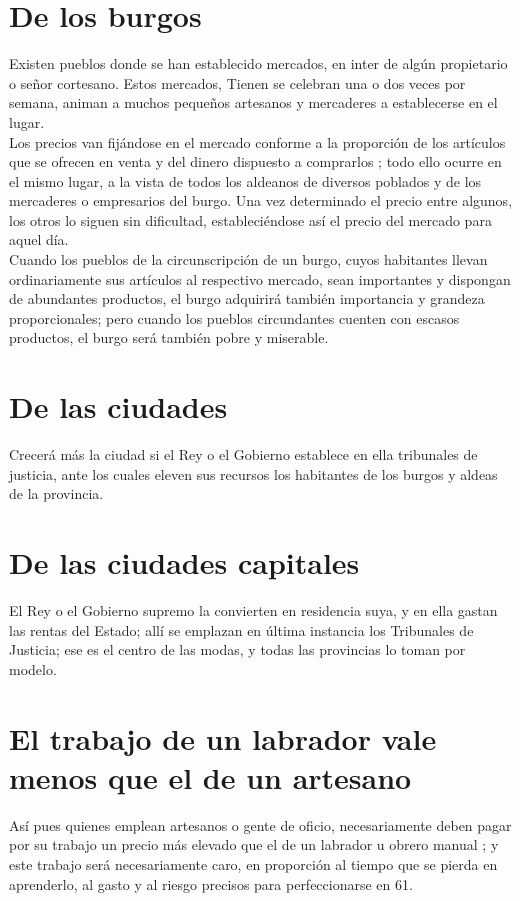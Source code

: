 \documentclass[10pt]{article}
\begin{document}
\begin{multicols}{1}
\section*{De los burgos}
Existen pueblos donde se han establecido mercados, en inter de algún propietario o señor cortesano. Estos mercados, Tienen se celebran una o dos veces por semana, animan a muchos pequeños artesanos y mercaderes a establecerse en el lugar.\\
Los precios van fijándose en el mercado conforme a la proporción de los artículos que se ofrecen en venta y del dinero dispuesto a comprarlos ; todo ello ocurre en el mismo lugar, a la vista de todos los aldeanos de diversos poblados y de los mercaderes o empresarios del burgo. Una vez determinado el precio entre algunos, los otros lo siguen sin dificultad, estableciéndose así el precio del mercado para aquel día.\\
Cuando los pueblos de la circunscripción de un burgo, cuyos habitantes llevan ordinariamente sus artículos al respectivo mercado, sean importantes y dispongan de abundantes productos, el burgo adquirirá también importancia y grandeza proporcionales; pero cuando los pueblos circundantes cuenten con escasos productos, el burgo será también pobre y miserable.
\section*{De las ciudades}
Crecerá más la ciudad si el Rey o el Gobierno establece en ella tribunales de justicia, ante los cuales eleven sus recursos los habitantes de los burgos y aldeas de la provincia.
\section*{De las ciudades capitales}
El Rey o el Gobierno supremo la convierten en residencia suya, y en ella gastan las rentas del Estado; allí se emplazan en última instancia los Tribunales de Justicia; ese es el centro de las modas, y todas las provincias lo toman por modelo.
\section*{El trabajo de un labrador vale menos que el de un artesano}
Así pues quienes emplean artesanos o gente de oficio, necesariamente deben pagar por su trabajo un precio más elevado que el de un labrador u obrero manual ; y este trabajo será necesariamente caro, en proporción al tiempo que se pierda en aprenderlo, al gasto y al riesgo precisos para perfeccionarse en 61.

\end{multicols}
\end{document}
